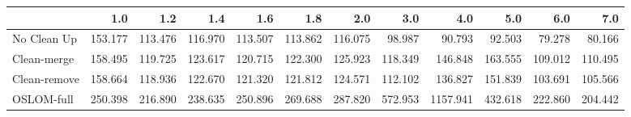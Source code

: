 \begin{tabular}{lrrrrrrrrrrr}
\toprule
{} &     1.0 &     1.2 &     1.4 &     1.6 &     1.8 &     2.0 &     3.0 &      4.0 &     5.0 &     6.0 &     7.0 \\
\midrule
No Clean Up  & 153.177 & 113.476 & 116.970 & 113.507 & 113.862 & 116.075 &  98.987 &   90.793 &  92.503 &  79.278 &  80.166 \\
Clean-merge  & 158.495 & 119.725 & 123.617 & 120.715 & 122.300 & 125.923 & 118.349 &  146.848 & 163.555 & 109.012 & 110.495 \\
Clean-remove & 158.664 & 118.936 & 122.670 & 121.320 & 121.812 & 124.571 & 112.102 &  136.827 & 151.839 & 103.691 & 105.566 \\
OSLOM-full   & 250.398 & 216.890 & 238.635 & 250.896 & 269.688 & 287.820 & 572.953 & 1157.941 & 432.618 & 222.860 & 204.442 \\
\bottomrule
\end{tabular}
